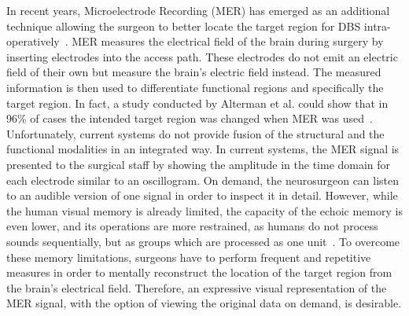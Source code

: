 \documentclass{vgtc}                          %
\begin{document}
In recent years, Microelectrode Recording (MER) has emerged as an additional technique allowing the surgeon to better locate the target region for DBS intra-operatively~\cite{Lenz1988}. MER measures the electrical field of the brain during surgery by inserting electrodes into the access path. These electrodes do not emit an electric field of their own but measure the brain's electric field instead. The measured information is then used to differentiate functional regions and specifically the target region. In fact, a study conducted by Alterman et al. could show that in 96\% of cases the intended target region was changed when MER was used~\cite{Alterman1999}. Unfortunately, current systems do not provide fusion of the structural and the functional modalities in an integrated way. In current systems, the MER signal is presented to the surgical staff by showing the amplitude in the time domain for each electrode similar to an oscillogram. On demand, the neurosurgeon can listen to an audible version of one signal in order to inspect it in detail. However, while the human visual memory is already limited, the capacity of the echoic memory is even lower, and its operations are more restrained, as humans do not process sounds sequentially, but as groups which are processed as one unit~\cite{Radvansky2005}. To overcome these memory limitations, surgeons have to perform frequent and repetitive measures in order to mentally reconstruct the location of the target region from the brain's electrical field. Therefore, an expressive visual representation of the MER signal, with the option of viewing the original data on demand, is desirable.
\end{document}
